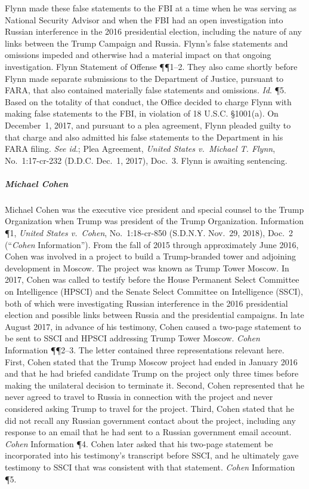 Flynn made these false statements to the FBI at a time when he was serving as National Security Advisor and when the FBI had an open investigation into Russian interference in the 2016 presidential election, including the nature of any links between the Trump Campaign and Russia.
Flynn's false statements and omissions impeded and otherwise had a material impact on that ongoing investigation.
Flynn Statement of Offense \P\P 1--2.
They also came shortly before Flynn made separate submissions to the Department of Justice, pursuant to FARA, that also contained materially false statements and omissions.
\textit{Id}. \P 5.
Based on the totality of that conduct, the Office decided to charge Flynn with making false statements to the FBI, in violation of 18 U.S.C. \S 1001(a).
On December~1, 2017, and pursuant to a plea agreement, Flynn pleaded guilty to that charge and also admitted his false statements to the Department in his FARA filing.
\textit{See id}.; Plea Agreement, \textit{United States v.\ Michael T. Flynn}, No.~1:17-cr-232 (D.D.C. Dec.~1, 2017), Doc.~3.
Flynn is awaiting sentencing.

\subparagraph{Michael Cohen}
Michael Cohen was the executive vice president and special counsel to the Trump Organization when Trump was president of the Trump Organization.
Information \P 1, \textit{United States v.\ Cohen}, No.~1:18-cr-850 (S.D.N.Y. Nov.~29, 2018), Doc.~2 (``\textit{Cohen} Information'').
From the fall of 2015 through approximately June 2016, Cohen was involved in a project to build a Trump-branded tower and adjoining development in Moscow.
The project was known as Trump Tower Moscow.
In 2017, Cohen was called to testify before the House Permanent Select Committee on Intelligence (HPSCI) and the Senate Select Committee on Intelligence (SSCI), both of which were investigating Russian interference in the 2016 presidential election and possible links between Russia and the presidential campaigns.
In late August 2017, in advance of his testimony, Cohen caused a two-page statement to be sent to SSCI and HPSCI addressing Trump Tower Moscow.
\textit{Cohen} Information \P\P 2--3.
The letter contained three representations relevant here.
First, Cohen stated that the Trump Moscow project had ended in January 2016 and that he had briefed candidate Trump on the project only three times before making the unilateral decision to terminate it.
Second, Cohen represented that he never agreed to travel to Russia in connection with the project and never considered asking Trump to travel for the project.
Third, Cohen stated that he did not recall any Russian government contact about the project, including any response to an email that he had sent to a Russian government email account.
\textit{Cohen} Information \P 4.
Cohen later asked that his two-page statement be incorporated into his testimony's transcript before SSCI, and he ultimately gave testimony to SSCI that was consistent with that statement.
\textit{Cohen} Information \P 5.

